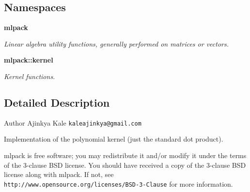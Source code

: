 \subsection*{Namespaces}
\begin{DoxyCompactItemize}
\item 
 {\bf mlpack}
\begin{DoxyCompactList}\small\item\em Linear algebra utility functions, generally performed on matrices or vectors. \end{DoxyCompactList}\item 
 {\bf mlpack\+::kernel}
\begin{DoxyCompactList}\small\item\em Kernel functions. \end{DoxyCompactList}\end{DoxyCompactItemize}


\subsection{Detailed Description}
\begin{DoxyAuthor}{Author}
Ajinkya Kale {\tt kaleajinkya@gmail.\+com}
\end{DoxyAuthor}
Implementation of the polynomial kernel (just the standard dot product).

mlpack is free software; you may redistribute it and/or modify it under the terms of the 3-\/clause B\+SD license. You should have received a copy of the 3-\/clause B\+SD license along with mlpack. If not, see {\tt http\+://www.\+opensource.\+org/licenses/\+B\+S\+D-\/3-\/\+Clause} for more information. 